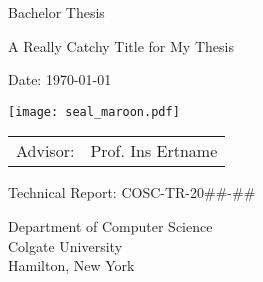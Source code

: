 \documentclass[../thesis.tex]{subfiles}
\begin{document}
\pagestyle{empty}

\begin{titlepage}
	\begin{center}\large

		\vfill
		\vfill
		\vfill
		\vfill

		Bachelor Thesis
		\vspace*{1.35cm}

		{\bfseries{\Large{A Really Catchy Title for My Thesis\par}}}

		\vspace*{1.35cm}

		\theauthor

		\vspace*{6.0mm}

		Date: \today 

		\vspace*{6.0mm}

        \texttt{[image: seal\_maroon.pdf]}

		\vspace*{6.0mm}
		\begin{tabular}{rl}
			Advisor: & Prof. Ins Ertname\\
		\end{tabular}

		\vspace*{7mm}

        Technical Report: COSC-TR-20\#\#-\#\#


		\vspace*{7mm}
		Department of Computer Science \\
		Colgate University \\
		Hamilton, New York

		\vspace*{12mm}
		\vfill
	\end{center}

\end{titlepage}
\end{document}
